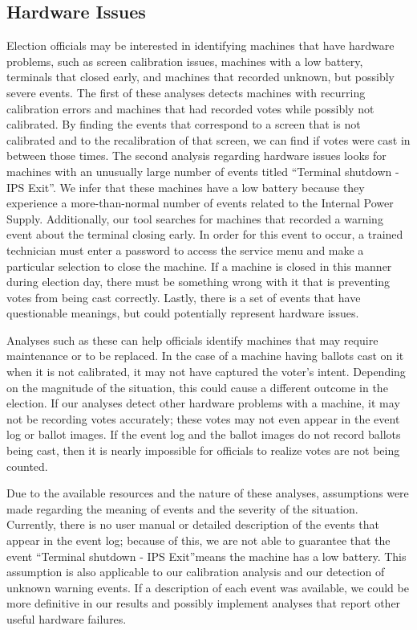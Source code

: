 \subsection{Hardware Issues}
Election officials may be interested in identifying machines that have hardware problems, such as screen calibration issues, machines with a low battery, terminals that closed early, and machines that recorded unknown, but possibly severe events.  The first of these analyses detects machines with recurring calibration errors and machines that had recorded votes while possibly not calibrated.  By finding the events that correspond to a screen that is not calibrated and to the recalibration of that screen, we can find if votes were cast in between those times.  The second analysis regarding hardware issues looks for machines with an unusually large number of events titled \textquotedblleft Terminal shutdown - IPS Exit\textquotedblright .  We infer that these machines have a low battery because they experience a more-than-normal number of events related to the Internal Power Supply.  Additionally, our tool searches for machines that recorded a warning event about the terminal closing early.  In order for this event to occur, a trained technician must enter a password to access the service menu and make a particular selection to close the machine.  If a machine is closed in this manner during election day, there must be something wrong with it that is preventing votes from being cast correctly.  Lastly, there is a set of events that have questionable meanings, but could potentially represent hardware issues.  

Analyses such as these can help officials identify machines that may require maintenance or to be replaced.  In the case of a machine having ballots cast on it when it is not calibrated, it may not have captured the voter's intent.  Depending on the magnitude of the situation, this could cause a different outcome in the election.  If our analyses detect other hardware problems with a machine, it may not be recording votes accurately; these votes may not even appear in the event log or ballot images.  If the event log and the ballot images do not record ballots being cast, then it is nearly impossible for officials to realize votes are not being counted.  

Due to the available resources and the nature of these analyses, assumptions were made regarding the meaning of events and the severity of the situation.  Currently, there is no user manual or detailed description of the events that appear in the event log; because of this, we are not able to guarantee that the event \textquotedblleft Terminal shutdown - IPS Exit\textquotedblright means the machine has a low battery.  This assumption is also applicable to our calibration analysis and our detection of unknown warning events.  If a description of each event was available, we could be more definitive in our results and possibly implement analyses that report other useful hardware failures.    

